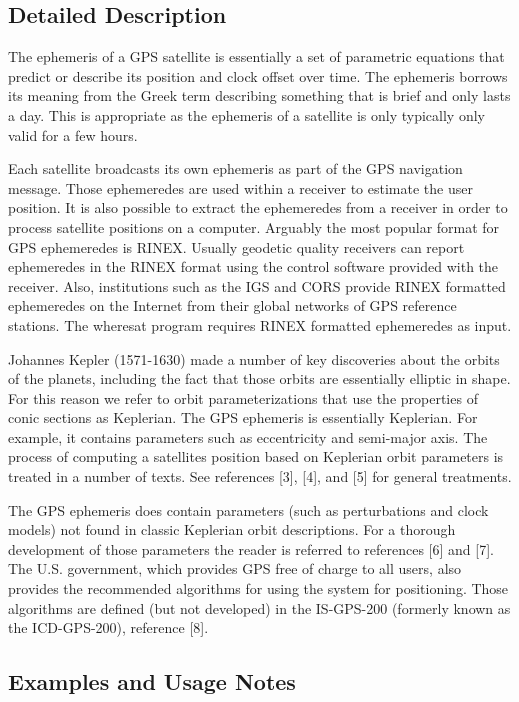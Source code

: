 \subsection{Detailed Description}
The ephemeris of a GPS satellite is essentially a set of parametric equations that predict or describe its position and clock offset over time. The ephemeris borrows its meaning from the Greek term describing something that is brief and only lasts a day. This is appropriate as the ephemeris of a satellite is only typically only valid for a few hours. 

Each satellite broadcasts its own ephemeris as part of the GPS navigation message. Those ephemeredes are used within a receiver to estimate the user position. It is also possible to extract the ephemeredes from a receiver in order to process satellite positions on a computer. Arguably the most popular format for GPS ephemeredes is RINEX. Usually geodetic quality receivers can report ephemeredes in the RINEX format using the control software provided with the receiver. Also, institutions such as the IGS and CORS provide RINEX formatted ephemeredes on the Internet from their global networks of GPS reference stations. The wheresat program requires RINEX formatted ephemeredes as input.

Johannes Kepler (1571-1630) made a number of key discoveries about the orbits of the planets, including the fact that those orbits are essentially elliptic in shape. For this reason we refer to orbit parameterizations that use the properties of conic sections as Keplerian. The GPS ephemeris is essentially Keplerian. For example, it contains parameters such as eccentricity and semi-major axis. The process of computing a satellites position based on Keplerian orbit parameters is treated in a number of texts. See references [3], [4], and [5] for general treatments.

The GPS ephemeris does contain parameters (such as perturbations and clock
models) not found in classic Keplerian orbit descriptions. For a thorough
development of those parameters the reader is referred to references [6] and
[7]. The U.S. government, which provides GPS free of charge to all users, also
provides the recommended algorithms for using the system for
positioning. Those algorithms are defined (but not developed) in the
IS-GPS-200 (formerly known as the ICD-GPS-200), reference [8].


\subsection{Examples and Usage Notes}

